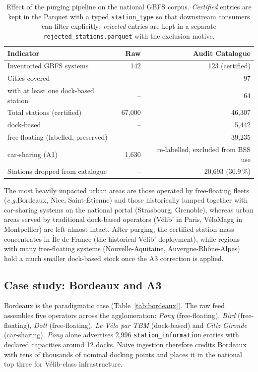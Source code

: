 \documentclass[11pt,a4paper]{article}
\newcommand{\eg}{\emph{e.g.}}
\begin{document}
\begin{table}[!htbp]
\centering
\caption{Effect of the purging pipeline on the national GBFS corpus.
\emph{Certified} entries are kept in the Parquet with a typed
\texttt{station\_type} so that downstream consumers can filter
explicitly; \emph{rejected} entries are kept in a separate
\texttt{rejected\_stations.parquet} with the exclusion motive.}
\label{tab:overview}
\small
\begin{tabular}{@{}lrr@{}}
\toprule
\textbf{Indicator} & \textbf{Raw} & \textbf{Audit Catalogue}\\
\midrule
Inventoried GBFS systems            & 142 & 123 (certified)\\
Cities covered                      & --  & 97 \\
\quad with at least one dock-based station & -- & 64 \\
Total stations (certified)          & 67{,}000 & 46{,}307 \\
\quad dock-based                    & --       & 5{,}442 \\
\quad free-floating (labelled, preserved) & -- & 39{,}235 \\
\quad car-sharing (A1)              & 1{,}630  & re-labelled, excluded from BSS use \\
Stations dropped from catalogue     & --       & 20{,}693 (30.9\,\%) \\
\bottomrule
\end{tabular}
\end{table}

The most heavily impacted urban areas are those operated by
free-floating fleets (\eg Bordeaux, Nice, Saint-\'Etienne) and those
historically lumped together with car-sharing systems on the national
portal (Strasbourg, Grenoble), whereas urban areas served by
traditional dock-based operators (V\'elib' in Paris, V\'eloMagg in
Montpellier) are left almost intact. After purging, the
certified-station mass concentrates in \^Ile-de-France (the historical
V\'elib' deployment), while regions with many free-floating systems
(Nouvelle-Aquitaine, Auvergne-Rh\^one-Alpes) hold a much smaller
dock-based stock once the A3 correction is applied.

\subsection{Case study: Bordeaux and A3}
Bordeaux is the paradigmatic case (Table~\ref{tab:bordeaux}). The raw
feed assembles five operators across the agglomeration: \emph{Pony}
(free-floating), \emph{Bird} (free-floating), \emph{Dott}
(free-floating), \emph{Le V\'elo par TBM} (dock-based) and \emph{Citiz
Gironde} (car-sharing). \emph{Pony} alone advertises 2{,}996
\texttt{station\_information} entries with declared capacities around
12 docks. Naive ingestion therefore credits Bordeaux with tens of
thousands of nominal docking points and places it in the national top
three for V\'elib-class infrastructure.
\end{document}
